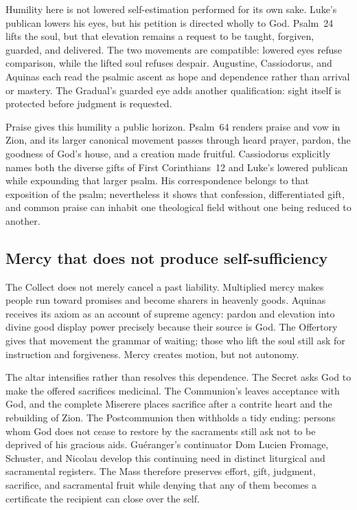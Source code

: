 Humility here is not lowered self-estimation performed for its own sake.
Luke's publican lowers his eyes, but his petition is directed wholly to God.
Psalm~24 lifts the soul, but that elevation remains a request to be taught,
forgiven, guarded, and delivered.  The two movements are compatible: lowered
eyes refuse comparison, while the lifted soul refuses despair.  Augustine,
Cassiodorus, and Aquinas each read the psalmic ascent as hope and dependence
rather than arrival or mastery.  The Gradual's guarded eye adds another
qualification: sight itself is protected before judgment is requested.

Praise gives this humility a public horizon.  Psalm~64 renders praise and vow
in Zion, and its larger canonical movement passes through heard prayer,
pardon, the goodness of God's house, and a creation made fruitful.  Cassiodorus
explicitly names both the diverse gifts of First Corinthians~12 and Luke's
lowered publican while expounding that larger psalm.  His correspondence
belongs to that exposition of the psalm; nevertheless it shows
that confession, differentiated gift, and common praise can inhabit
one theological field without one being reduced to another.

\subsection*{Mercy that does not produce self-sufficiency}

The Collect does not merely cancel a past liability.  Multiplied mercy makes
people run toward promises and become sharers in heavenly goods.  Aquinas
receives its axiom as an account of supreme agency: pardon and elevation into
divine good display power precisely because their source is God.  The
Offertory gives that movement the grammar of waiting; those who lift the soul
still ask for instruction and forgiveness.  Mercy creates motion, but not
autonomy.

The altar intensifies rather than resolves this dependence.  The Secret asks
God to make the offered sacrifices medicinal.  The Communion's
 leaves acceptance with God, and the complete Miserere
places sacrifice after a contrite heart and the rebuilding of Zion.  The
Postcommunion then withholds a tidy ending: persons whom God does not cease to
restore by the sacraments still ask not to be deprived of his gracious aids.
Guéranger's continuator Dom Lucien Fromage, Schuster, and Nicolau develop this
continuing need in distinct
liturgical and sacramental registers.  The Mass therefore preserves effort,
gift, judgment, sacrifice, and sacramental fruit while denying that any of
them becomes a certificate the recipient can close over the self.

